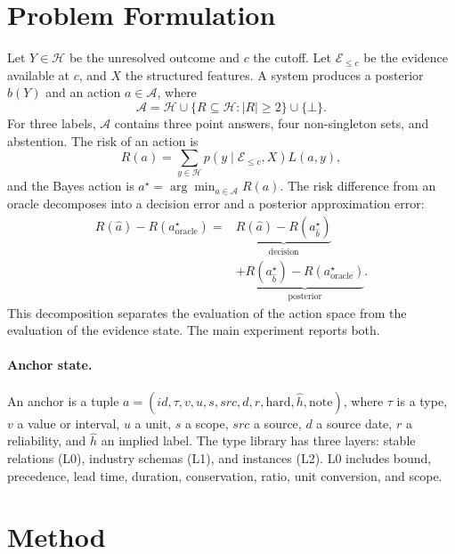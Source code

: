 \documentclass[11pt]{article}
\begin{document}
\section{Problem Formulation}

Let $Y\in\mathcal H$ be the unresolved outcome and $c$ the cutoff. Let $\mathcal E_{\le c}$ be the evidence available at $c$, and $X$ the structured features. A system produces a posterior $b(Y)$ and an action $a\in\mathcal A$, where
\begin{equation}
\mathcal A=\mathcal H\cup\{R\subseteq\mathcal H:|R|\ge2\}\cup\{\bot\}.
\end{equation}
For three labels, $\mathcal A$ contains three point answers, four non-singleton sets, and abstention. The risk of an action is
\begin{equation}
R(a)=\sum_{y\in\mathcal H}p(y\mid\mathcal E_{\le c},X)L(a,y),
\end{equation}
and the Bayes action is $a^\star=\arg\min_{a\in\mathcal A}R(a)$. The risk difference from an oracle decomposes into a decision error and a posterior approximation error:
\begin{equation}
\begin{aligned}
R(\hat a)-R(a^\star_{\text{oracle}})
={}& \underbrace{R(\hat a)-R(a^\star_{\hat b})}_{\text{decision}}\\
&+\underbrace{R(a^\star_{\hat b})-R(a^\star_{\text{oracle}})}_{\text{posterior}}.
\end{aligned}
\end{equation}
This decomposition separates the evaluation of the action space from the evaluation of the evidence state. The main experiment reports both.

\paragraph{Anchor state.}
An anchor is a tuple $a=(id,\tau,v,u,s,src,d,r,\mathrm{hard},\hat h,\mathrm{note})$, where $\tau$ is a type, $v$ a value or interval, $u$ a unit, $s$ a scope, $src$ a source, $d$ a source date, $r$ a reliability, and $\hat h$ an implied label. The type library has three layers: stable relations (L0), industry schemas (L1), and instances (L2). L0 includes bound, precedence, lead time, duration, conservation, ratio, unit conversion, and scope.

\section{Method}
\end{document}
